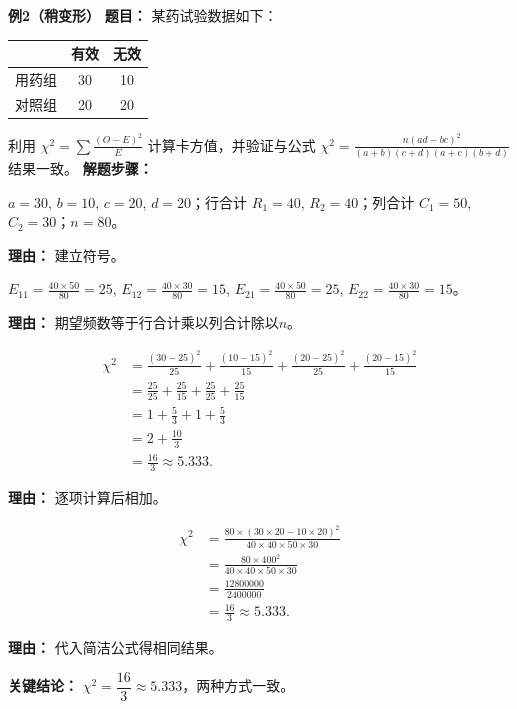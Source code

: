 \medskip
\textbf{\textcolor{CExample}{例2（稍变形）}}
\textbf{\textcolor{CExample}{题目：}}
某药试验数据如下：
\begin{center}

	\begin{tabular}
		{c|cc} & 有效 & 无效 \\ \hline 用药组 & 30 & 10 \\ 对照组 & 20 & 20
	\end{tabular}

\end{center}
利用 $\chi^2 = \sum\frac{(O-E)^2}{E}$ 计算卡方值，并验证与公式 $\chi^2 = \frac{n(ad-bc)^2}{(a+b)(c+d)(a+c)(b+d)}$ 结果一致。
\textbf{\textcolor{CExample}{解题步骤：}}
\begin{description}[style=nextline, leftmargin=2.8em, labelsep=0.5em, itemsep=0.45em]
	\item[\textbf{第一步（标注符号与合计）：}]
		$a=30$, $b=10$, $c=20$, $d=20$；行合计 $R_1=40$, $R_2=40$；列合计 $C_1=50$, $C_2=30$；$n=80$。
		\par\textbf{理由：} 建立符号。
	\item[\textbf{第二步（计算期望频数）：}]
		$E_{11} = \frac{40\times50}{80}=25$, $E_{12} = \frac{40\times30}{80}=15$, $E_{21} = \frac{40\times50}{80}=25$, $E_{22} = \frac{40\times30}{80}=15$。
		\par\textbf{理由：} 期望频数等于行合计乘以列合计除以$n$。
	\item[\textbf{第三步（用定义计算）：}]
		\[
			\begin{aligned}
				\chi^2 &= \frac{(30-25)^2}{25} + \frac{(10-15)^2}{15} + \frac{(20-25)^2}{25} + \frac{(20-15)^2}{15} \\ &= \frac{25}{25} + \frac{25}{15} + \frac{25}{25} + \frac{25}{15} \\ &= 1 + \frac{5}{3} + 1 + \frac{5}{3} \\ &= 2 + \frac{10}{3} \\ &= \frac{16}{3} \approx 5.333.
		\end{aligned}
		\]
		\par\textbf{理由：} 逐项计算后相加。
	\item[\textbf{第四步（用简洁公式验证）：}]
		\[
			\begin{aligned}
				\chi^2 &= \frac{80\times(30\times20-10\times20)^2}{40\times40\times50\times30} \\ &= \frac{80\times400^2}{40\times40\times50\times30} \\ &= \frac{12800000}{2400000} \\ &= \frac{16}{3} \approx 5.333.
		\end{aligned}
		\]
		\par\textbf{理由：} 代入简洁公式得相同结果。
\end{description}
\textbf{\textcolor{CExample}{关键结论：}}
$\chi^2 = \dfrac{16}{3} \approx 5.333$，两种方式一致。

